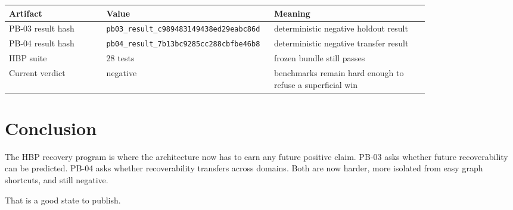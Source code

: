\documentclass[11pt]{article}
\begin{document}
\begin{longtable}{p{0.22\linewidth}p{0.25\linewidth}p{0.35\linewidth}}
\toprule
Artifact & Value & Meaning \\
\midrule
PB-03 result hash & \texttt{pb03\_result\_c989483149438ed29eabc86d} & deterministic negative holdout result \\
PB-04 result hash & \texttt{pb04\_result\_7b13bc9285cc288cbfbe46b8} & deterministic negative transfer result \\
HBP suite & 28 tests & frozen bundle still passes \\
Current verdict & negative & benchmarks remain hard enough to refuse a superficial win \\
\bottomrule
\end{longtable}

\section{Conclusion}

The HBP recovery program is where the architecture now has to earn any future positive claim. PB-03 asks whether future recoverability can be predicted. PB-04 asks whether recoverability transfers across domains. Both are now harder, more isolated from easy graph shortcuts, and still negative.

That is a good state to publish.
\end{document}
